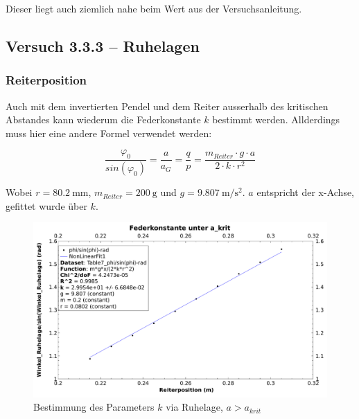 Dieser liegt auch ziemlich nahe beim Wert aus der Versuchsanleitung.


\clearpage
\subsection{Versuch 3.3.3 -- Ruhelagen}
\label{subsec:ruhelagen}


\subsubsection{Reiterposition}
\label{subsubsec:reiterpos}


Auch  mit dem  invertierten Pendel  und dem  Reiter ausserhalb  des kritischen
Abstandes kann  wiederum die  Federkonstante $k$  bestimmt werden. Allderdings
muss hier eine andere Formel verwendet werden:

\begin{equation}
    \frac{\varphi_0}{sin(\varphi_0)} = \frac{a}{a_G} = \frac{q}{p} = \frac{m_{Reiter} \cdot g \cdot a}{2 \cdot k \cdot r^2}
\end{equation}

Wobei $r =  \SI{80.2}{\milli\meter}$, $m_{Reiter} = \SI{200}{\gram}$  und $g =
\SI{9.807}{\meter\per\second\squared}$. $a$  entspricht der  x-Achse, gefittet
wurde \"uber $k$.

\begin{figure}[h!]
    \centering
    \includegraphics[width=\textwidth]{images/333a.pdf}
    \caption{%
        Bestimmung des Parameters $k$ via Ruhelage, $a>a_{krit}$
    }
    \label{fig:333a}
\end{figure}

